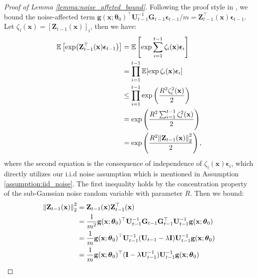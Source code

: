 \begin{proof}[Proof of Lemma \ref{lemma:noise_affeted_bound}]
Following the proof style in \cite{vakili2021optimal}, we bound the noise-affected term $\mathbf{g}(\mathbf{x}; \boldsymbol{\theta}_0)^\top \mathbf{U}^{-1}_{t-1} \mathbf{G}_{t-1} \boldsymbol{\epsilon}_{t-1}/m = \mathbf{Z}_{t-1}^\top (\mathbf{x})\boldsymbol{\epsilon}_{t-1}$. Let $\zeta_i(\mathbf{x}) = [\mathbf{Z}_{t-1}(\mathbf{x})]_i$, then we have: 
\begin{equation}
\begin{split}
    \mathbb E \left[\exp ( \mathbf{Z}_{t-1}^\top(\mathbf{x})\boldsymbol{\epsilon}_{t-1} ) \right] & =  \mathbb{E}\left[ \exp \sum_{i=1}^{t-1} \zeta_i(\mathbf{x}) \boldsymbol{\epsilon}_i  \right] \\
    & = \prod_{i=1}^{t-1} \mathbb{E} [\exp \zeta_i(\mathbf{x}) \boldsymbol{\epsilon}_i] \\
    &  \leq \prod_{i=1}^{t-1} \exp \left( \frac{R^2 \zeta_i^2(\mathbf{x})}{2} \right)\\
    &  = \exp \left (\frac{R^2 \sum_{i=1}^{t-1}\zeta_i^2(\mathbf{x})}{2} \right) \\
     & = \mathbb \exp \left( \frac{R^2\norm{\mathbf{Z}_{t-1}(\mathbf{x})}^2_2}{2} \right), \\
\end{split}
\label{eqn:noise_effect}
\end{equation}
where the second equation is the consequence of independence of $\zeta_i(\mathbf{x})\boldsymbol{\epsilon}_i$, which directly utilizes our i.i.d noise assumption which is mentioned in Assumption \ref{assumption:iid_noise}. The first inequality holds by the concentration property of the sub-Gaussian noise random variable with parameter $R$. Then we bound:  
\begin{equation}
\label{eqn:bound_Z}
\begin{split}
        \norm{\mathbf{Z}_{t-1}(\mathbf{x})}^2_2 & = \mathbf{Z}_{t-1}(\mathbf{x}) \mathbf{Z}_{t-1}^\top(\mathbf{x})\\
        & = \frac{1}{m^2} \mathbf{g}(\mathbf{x}; \boldsymbol{\theta}_0)^\top \mathbf{U}^{-1}_{t-1} \mathbf{G}_{t-1} \mathbf{G}_{t-1}^\top \mathbf{U}^{-1}_{t-1}\mathbf{g}(\mathbf{x}; \boldsymbol{\theta}_0)
        \\
        & = \frac{1}{m} \mathbf{g}(\mathbf{x}; \boldsymbol{\theta}_0)^\top \mathbf{U}^{-1}_{t-1} (\mathbf{U}_{t-1} - \lambda\mathbf{I}) \mathbf{U}^{-1}_{t-1}\mathbf{g}(\mathbf{x}; \boldsymbol{\theta}_0) \\
        & = \frac{1}{m}\mathbf{g}(\mathbf{x}; \boldsymbol{\theta}_0)^\top  (\mathbf{I} - \lambda\mathbf{U}^{-1}_{t-1}) \mathbf{U}^{-1}_{t-1} \mathbf{g}(\mathbf{x}; \boldsymbol{\theta}_0)\\

\end{split}
\end{equation}
\end{proof}

